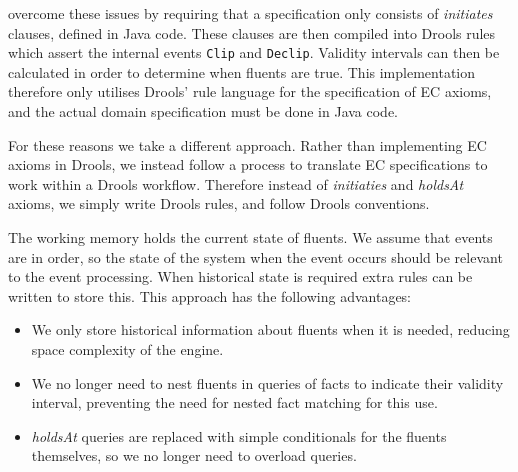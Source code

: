 \citet{Bragaglia2012} overcome these issues by requiring that a specification
only consists of \emph{initiates} clauses, defined in Java code. These clauses
are then compiled into Drools rules which assert the internal events
\texttt{Clip} and \texttt{Declip}. Validity intervals can then be calculated
in order to determine when fluents are true. This implementation therefore only
utilises Drools' rule language for the specification of \ac{EC} axioms, and the
actual domain specification must be done in Java code.


For these reasons we take a different approach. Rather than implementing \ac{EC}
axioms in Drools, we instead follow a process to translate \ac{EC}
specifications to work within a Drools workflow. Therefore instead of \emph{initiaties}
and \emph{holdsAt} axioms, we simply write Drools rules, and follow Drools
conventions.

The working memory holds the current state of fluents. We assume that events
are in order, so the state of the system when the event occurs should be
relevant to the event processing. When historical state is required extra
rules can be written to store this. This approach has the following advantages:
\begin{itemize}
\item We only store historical information about fluents when it is needed,
reducing space complexity of the engine.
\item We no longer need to nest fluents in queries of facts to indicate
their validity interval, preventing the need for nested fact matching for this
use.
\item \emph{holdsAt} queries are replaced with simple conditionals for the
fluents themselves, so we no longer need to overload queries.
\end{itemize}

